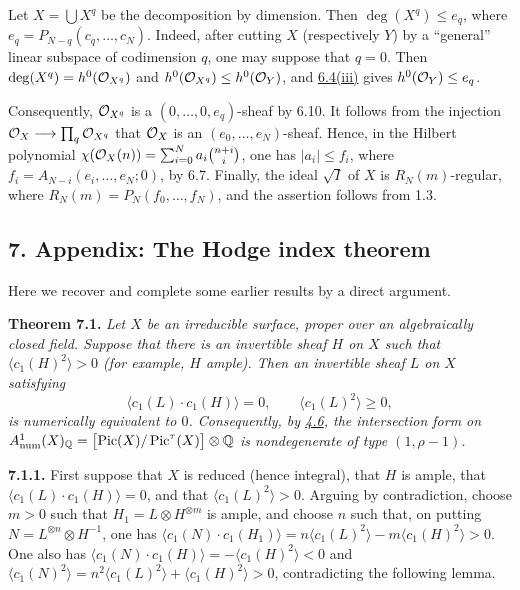 Let $X=\bigcup X^q$ be the decomposition by dimension. Then
$\deg(X^q)\leq e_q$, where $e_q=P_{N-q}(c_q,\ldots,c_N)$.
Indeed, after cutting $X$ (respectively $Y$) by a ``general'' linear subspace of codimension $q$, one may suppose that $q=0$. Then
$\deg(X^q)=h^0(\mathcal O_{X^q})$ and
$h^0(\mathcal O_{X^q})\leq h^0(\mathcal O_Y)$, and \hyperlink{sga6.e13.thm.6-4}{6.4(iii)} gives
$h^0(\mathcal O_Y)\leq e_q$.

Consequently, $\mathcal O_{X^q}$ is a $(0,\ldots,0,e_q)$-sheaf by 6.10. It
follows from the injection $\mathcal O_X\longrightarrow\prod_q\mathcal O_{X^q}$ that
$\mathcal O_X$ is an $(e_0,\ldots,e_N)$-sheaf. Hence, in the Hilbert polynomial
$\chi(\mathcal O_X(n))=\sum_{i=0}^{N}a_i\binom{n+i}{i}$, one has
$|a_i|\leq f_i$, where $f_i=A_{N-i}(e_i,\ldots,e_N;0)$, by 6.7.
Finally, the ideal $\sqrt I$ of $X$ is $R_N(m)$-regular, where
$R_N(m)=P_N(f_0,\ldots,f_N)$, and the assertion follows from 1.3.

\subsection*{7. Appendix: The Hodge index theorem}

Here we recover and complete some earlier results by a direct argument.

\textbf{Theorem 7.1.} \emph{Let $X$ be an irreducible surface, proper
over an algebraically closed field. Suppose that there is an invertible
sheaf $H$ on $X$ such that $\langle c_1(H)^2\rangle>0$ (for example,
$H$ ample). Then an invertible sheaf $L$ on $X$ satisfying
\[
  \langle c_1(L)\cdot c_1(H)\rangle=0,
  \qquad
  \langle c_1(L)^2\rangle\geq0,
\]
is numerically equivalent to $0$. Consequently, by \hyperlink{sga6.e13.thm.4-6}{4.6}, the intersection
form on $A^1_{\mathrm{num}}(X)_{\mathbb Q}
=\bigl[\operatorname{Pic}(X)/\operatorname{Pic}^\tau(X)\bigr]\otimes\mathbb Q$ is nondegenerate of type
$(1,\rho-1)$.}

\textbf{7.1.1.} First suppose that $X$ is reduced (hence integral), that
$H$ is ample, that $\langle c_1(L)\cdot c_1(H)\rangle=0$, and that
$\langle c_1(L)^2\rangle>0$. Arguing by contradiction, choose $m>0$
such that $H_1=L\otimes H^{\otimes m}$ is ample, and choose $n$ such
that, on putting $N=L^{\otimes n}\otimes H^{-1}$, one has
$\langle c_1(N)\cdot c_1(H_1)\rangle
=n\langle c_1(L)^2\rangle-m\langle c_1(H)^2\rangle>0$. One also has
$\langle c_1(N)\cdot c_1(H)\rangle=-\langle c_1(H)^2\rangle<0$ and
$\langle c_1(N)^2\rangle
=n^2\langle c_1(L)^2\rangle+\langle c_1(H)^2\rangle>0$, contradicting
the following lemma.

